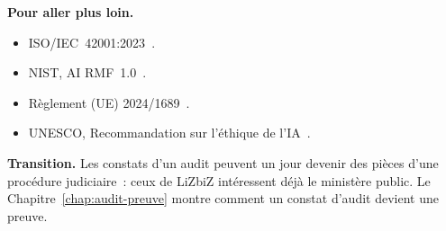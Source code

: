 \begin{boxinfo}
\textbf{Pour aller plus loin.}
\begin{itemize}
    \item ISO/IEC~42001:2023~\cite{iso42001_2023}.
    \item NIST, AI RMF~1.0~\cite{nist2023airmf}.
    \item Règlement (UE) 2024/1689~\cite{ue2024aiact}.
    \item UNESCO, Recommandation sur l'éthique de l'IA~\cite{unesco2021ethique}.
\end{itemize}
\end{boxinfo}

\begin{boxinfo}
\textbf{Transition.} Les constats d'un audit peuvent un jour devenir des
pièces d'une procédure judiciaire~: ceux de LiZbiZ intéressent déjà le
ministère public. Le Chapitre~\ref{chap:audit-preuve} montre comment un
constat d'audit devient une preuve.
\end{boxinfo}
